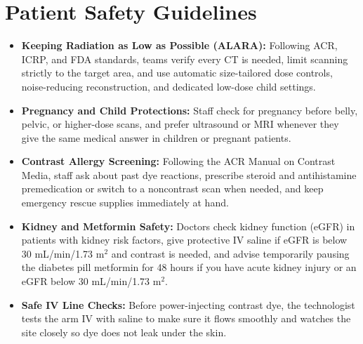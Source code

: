 \section{Patient Safety Guidelines}
\begin{itemize}
    \item \textbf{Keeping Radiation as Low as Possible (ALARA):} Following ACR, ICRP, and FDA standards, teams verify every CT is needed, limit scanning strictly to the target area, and use automatic size-tailored dose controls, noise-reducing reconstruction, and dedicated low-dose child settings.
    \item \textbf{Pregnancy and Child Protections:} Staff check for pregnancy before belly, pelvic, or higher-dose scans, and prefer ultrasound or MRI whenever they give the same medical answer in children or pregnant patients.
    \item \textbf{Contrast Allergy Screening:} Following the ACR Manual on Contrast Media, staff ask about past dye reactions, prescribe steroid and antihistamine premedication or switch to a noncontrast scan when needed, and keep emergency rescue supplies immediately at hand.
    \item \textbf{Kidney and Metformin Safety:} Doctors check kidney function (eGFR) in patients with kidney risk factors, give protective IV saline if eGFR is below 30 mL/min/1.73 m$^2$ and contrast is needed, and advise temporarily pausing the diabetes pill metformin for 48 hours if you have acute kidney injury or an eGFR below 30 mL/min/1.73 m$^2$.
    \item \textbf{Safe IV Line Checks:} Before power-injecting contrast dye, the technologist tests the arm IV with saline to make sure it flows smoothly and watches the site closely so dye does not leak under the skin.
\end{itemize}

